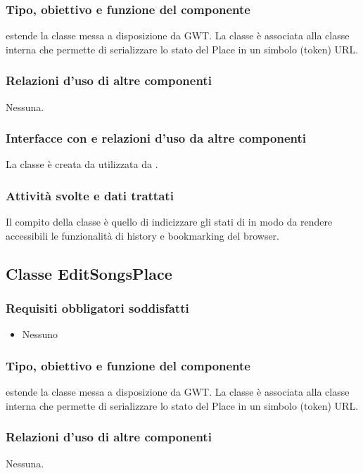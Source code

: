 \subsubsection*{Tipo, obiettivo e funzione del componente}
 estende la classe  messa a disposizione da GWT. La
classe \`e associata alla classe interna  che permette di
serializzare lo stato del Place in un simbolo (token) URL.
\subsubsection*{Relazioni d'uso di altre componenti}
Nessuna.
\subsubsection*{Interfacce con e relazioni d'uso da altre componenti}
La classe \`e creata da  utilizzata da .
\subsubsection*{Attivit\`a svolte e dati trattati}
Il compito della classe \`e quello di indicizzare gli stati di
 in modo da rendere accessibili le funzionalit\`a di
history e bookmarking del browser.

\subsection{Classe EditSongsPlace}
\subsubsection*{Requisiti obbligatori soddisfatti}
\begin{itemize}
    \item Nessuno
\end{itemize}
\subsubsection*{Tipo, obiettivo e funzione del componente}
 estende la classe  messa a disposizione da GWT. La
classe \`e associata alla classe interna  che permette di
serializzare lo stato del Place in un simbolo (token) URL.
\subsubsection*{Relazioni d'uso di altre componenti}
Nessuna.
